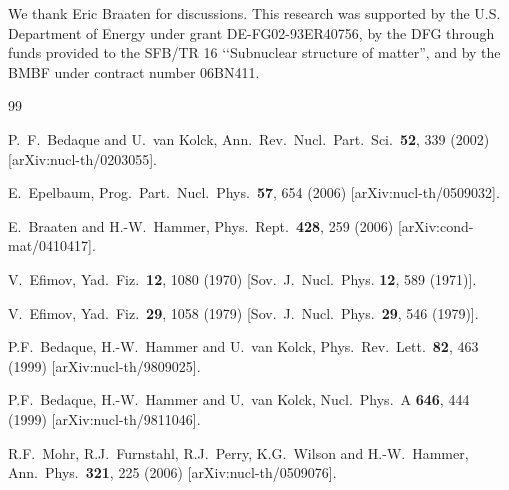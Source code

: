 \documentclass[prc,preprint,showpacs,tightenlines,%
nofootinbib]{revtex4}
\begin{document}
%
\begin{acknowledgments}
We thank Eric Braaten for discussions.
This research was supported by the U.S. Department of Energy under 
grant DE-FG02-93ER40756, by the DFG through funds provided
to the SFB/\-TR 16 \lq\lq Subnuclear structure of matter'', and by the
BMBF under contract number 06BN411.
\end{acknowledgments}
%
%
%
%
\begin{thebibliography}{99}

P.~F.~Bedaque and U.~van Kolck,
Ann.\ Rev.\ Nucl.\ Part.\ Sci.\  {\bf 52}, 339 (2002)
[arXiv:nucl-th/0203055].

  E.~Epelbaum,
  Prog.\ Part.\ Nucl.\ Phys.\  {\bf 57}, 654 (2006)
  [arXiv:nucl-th/0509032].

  E.~Braaten and H.-W.~Hammer,
  Phys.\ Rept.\  {\bf 428}, 259 (2006)
  [arXiv:cond-mat/0410417].

V.~Efimov,
        Yad.\ Fiz.\ {\bf 12}, 1080 (1970)
        [Sov.\ J.\ Nucl.\ Phys. {\bf 12}, 589 (1971)].

V.~Efimov,
        Yad.\ Fiz.\ {\bf 29}, 1058 (1979)
        [Sov.\ J.\ Nucl.\ Phys.\ {\bf 29}, 546 (1979)].


P.F.~Bedaque, H.-W.~Hammer and U.~van Kolck,
Phys.\ Rev.\ Lett.\  {\bf 82}, 463 (1999)
[arXiv:nucl-th/9809025].

P.F.~Bedaque, H.-W.~Hammer and U.~van Kolck,
Nucl.\ Phys.\ A {\bf 646}, 444 (1999)
[arXiv:nucl-th/9811046].

  R.F.~Mohr, R.J.~Furnstahl, R.J.~Perry, K.G.~Wilson and H.-W.~Hammer,
  Ann.\ Phys.\  {\bf 321}, 225 (2006)
  [arXiv:nucl-th/0509076].


\end{thebibliography}
\end{document}
